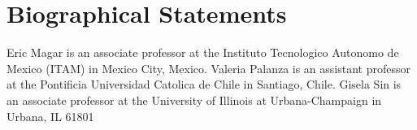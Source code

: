 \documentclass[letter,12pt]{article}
\begin{document}
\section*{Biographical Statements}
Eric Magar is an associate professor at the Instituto Tecnologico Autonomo de Mexico (ITAM) in Mexico City, Mexico. \newline
Valeria Palanza is an assistant professor at the Pontificia Universidad Catolica de Chile in Santiago, Chile. \newline
Gisela Sin is an associate professor at the University of Illinois at Urbana-Champaign in Urbana, IL 61801
\end{document}
